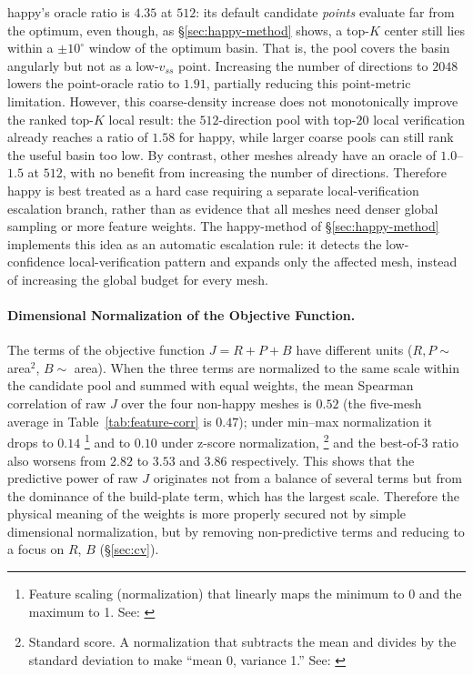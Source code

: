 \documentclass[11pt,a4paper]{article}
\begin{document}
happy's oracle ratio is $4.35$ at $512$: its default candidate \emph{points} evaluate far from the optimum, even
though, as \S\ref{sec:happy-method} shows, a top-$K$ center still lies within a $\pm 10^\circ$ window of the optimum
basin. That is, the pool covers the basin angularly but not as a low-$v_{ss}$ point.
Increasing the number of directions to $2048$ lowers the point-oracle ratio to $1.91$, partially reducing this point-metric limitation.
However, this coarse-density increase does not monotonically improve the ranked top-$K$ local result:
the $512$-direction pool with top-$20$ local verification already reaches a ratio of $1.58$ for happy,
while larger coarse pools can still rank the useful basin too low.
By contrast, other meshes already have an oracle of $1.0$--$1.5$ at $512$, with no benefit from increasing the number of directions.
Therefore happy is best treated as a hard case requiring a separate local-verification escalation branch,
rather than as evidence that all meshes need denser global sampling or more feature weights.
The happy-method of \S\ref{sec:happy-method} implements this idea as an automatic escalation rule:
it detects the low-confidence local-verification pattern and expands only the affected mesh, instead of increasing the global budget for every mesh.

\paragraph{Dimensional Normalization of the Objective Function.}
The terms of the objective function $J=R+P+B$ have different units ($R,P\sim$ area$^2$, $B\sim$ area).
When the three terms are normalized to the same scale within the candidate pool and summed with equal weights,
the mean Spearman correlation of raw $J$ over the four non-happy meshes is $0.52$ (the five-mesh average in Table~\ref{tab:feature-corr} is $0.47$);
under min--max normalization it drops to $0.14$%
\footnote{Feature scaling (normalization) that linearly maps the minimum to 0 and the maximum to 1. See: \cite{hanmining}}
and to $0.10$ under z-score normalization,%
\footnote{Standard score. A normalization that subtracts the mean and divides by the standard deviation to make ``mean 0, variance 1.''
See: \cite{hanmining}}
and the best-of-3 ratio also worsens from $2.82$ to $3.53$ and $3.86$ respectively.
This shows that the predictive power of raw $J$ originates not from a balance of several terms but from the dominance of the build-plate term, which has the largest scale.
Therefore the physical meaning of the weights is more properly secured not by simple dimensional normalization,
but by removing non-predictive terms and reducing to a focus on $R$, $B$ (\S\ref{sec:cv}).
\end{document}
